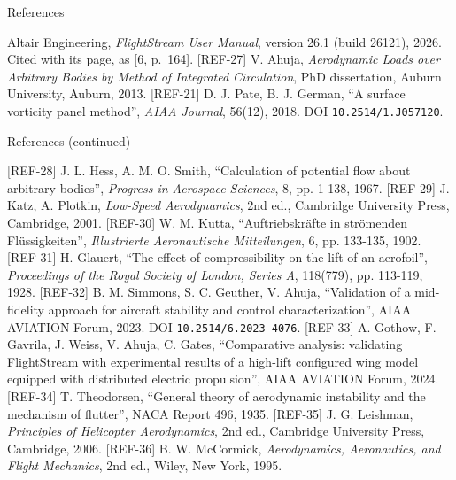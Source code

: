 \documentclass[aspectratio=169,11pt]{beamer}
\begin{document}






\begin{frame}{References}
\begin{reflist}
   
   
   
   
   \recordsref
   Altair Engineering, \emph{FlightStream User Manual}, version 26.1
        (build 26121), 2026. Cited with its page, as [6, p.~164].
   [REF-27] V. Ahuja, \emph{Aerodynamic Loads over Arbitrary Bodies by Method
        of Integrated Circulation}, PhD dissertation, Auburn University, Auburn,
        2013.
   [REF-21] D. J. Pate, B. J. German, ``A surface vorticity panel method'',
        \emph{AIAA Journal}, 56(12), 2018. DOI \texttt{10.2514/1.J057120}.
\end{reflist}
\end{frame}

\begin{frame}{References (continued)}
\begin{reflist}
  \setcounter{enumi}{8}
   [REF-28] J. L. Hess, A. M. O. Smith, ``Calculation of potential flow about
        arbitrary bodies'', \emph{Progress in Aerospace Sciences}, 8,
        pp. 1-138, 1967.
   [REF-29] J. Katz, A. Plotkin, \emph{Low-Speed Aerodynamics}, 2nd ed.,
        Cambridge University Press, Cambridge, 2001.
   [REF-30] W. M. Kutta, ``Auftriebskr\"afte in str\"omenden Fl\"ussigkeiten'',
        \emph{Illustrierte Aeronautische Mitteilungen}, 6, pp. 133-135, 1902.
   [REF-31] H. Glauert, ``The effect of compressibility on the lift of an
        aerofoil'', \emph{Proceedings of the Royal Society of London, Series
        A}, 118(779), pp. 113-119, 1928.
   [REF-32] B. M. Simmons, S. C. Geuther, V. Ahuja, ``Validation of a
        mid-fidelity approach for aircraft stability and control
        characterization'', AIAA AVIATION Forum, 2023. DOI
        \texttt{10.2514/6.2023-4076}.
   [REF-33] A. Gothow, F. Gavrila, J. Weiss, V. Ahuja, C. Gates,
        ``Comparative analysis: validating FlightStream with experimental
        results of a high-lift configured wing model equipped with distributed
        electric propulsion'', AIAA AVIATION Forum, 2024.
   [REF-34] T. Theodorsen, ``General theory of aerodynamic instability and the
        mechanism of flutter'', NACA Report 496, 1935.
   [REF-35] J. G. Leishman, \emph{Principles of Helicopter Aerodynamics}, 2nd
        ed., Cambridge University Press, Cambridge, 2006.
   [REF-36] B. W. McCormick, \emph{Aerodynamics, Aeronautics, and Flight
        Mechanics}, 2nd ed., Wiley, New York, 1995.
\end{reflist}
\end{frame}
\end{document}
